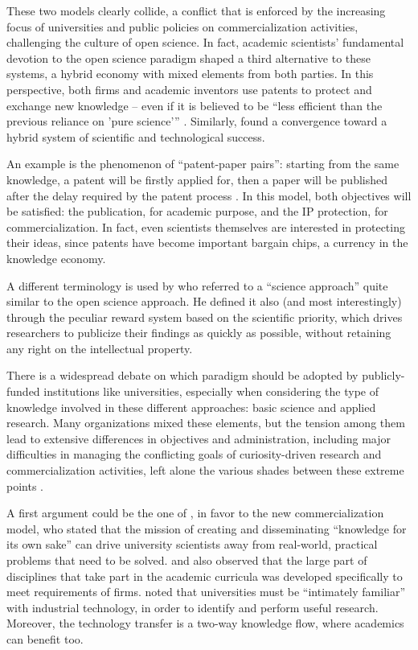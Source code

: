 These two models clearly collide, a conflict that is enforced by the increasing focus of universities and public policies on commercialization activities, challenging the culture of open science. In fact, academic scientists' fundamental devotion to the open science paradigm shaped a third alternative to these systems, a hybrid economy with mixed elements from both parties. In this perspective, both firms and academic inventors use patents to protect and exchange new knowledge – even if it is believed to be \enquote{less efficient than the previous reliance on 'pure science'} \citep{Geuna2009}. Similarly, \citet{OwenSmith2001} found a convergence toward a hybrid system of scientific and technological success.

An example is the phenomenon of \enquote{patent-paper pairs}: starting from the same knowledge, a patent will be firstly applied for, then a paper will be published after the delay required by the patent process \citep{Murray2005}. In this model, both objectives will be satisfied: the publication, for academic purpose, and the IP protection, for commercialization. In fact, even scientists themselves are interested in protecting their ideas, since patents have become important bargain chips, a currency in the knowledge economy.

A different terminology is used by \citet{Stern2004} who referred to a \enquote{science approach} quite similar to the open science approach. He defined it also (and most interestingly) through the peculiar reward system based on the scientific priority, which drives researchers to publicize their findings as quickly as possible, without retaining any right on the intellectual property. 

There is a widespread debate on which paradigm should be adopted by publicly-funded institutions like universities, especially when considering the type of knowledge involved in these different approaches: basic science and applied research. Many organizations mixed these elements, but the tension among them lead to extensive differences in objectives and administration, including major difficulties in managing the conflicting goals of curiosity-driven research and commercialization activities, left alone the various shades between these extreme points \citep{Rasmussen2006}.

A first argument could be the one of \citet{Geuna2009}, in favor to the new commercialization model, who stated that the mission of creating and disseminating \enquote{knowledge for its own sake} can drive university scientists away from real-world, practical problems that need to be solved. \citet{Rosenberg1994} and \citet{Nelson1998} also observed that the large part of disciplines that take part in the academic curricula was developed specifically to meet requirements of firms. \citet{Balconi2006} noted that universities must be \enquote{intimately familiar} with industrial technology, in order to identify and perform useful research. Moreover, the technology transfer is a two-way knowledge flow, where academics can benefit too.

